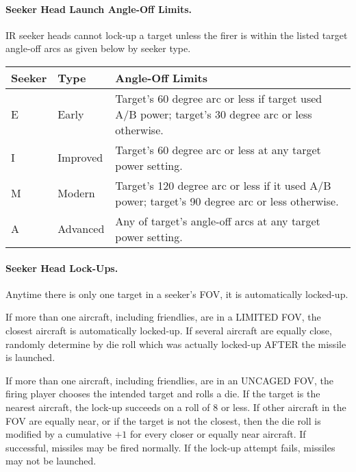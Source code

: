 \paragraph{Seeker Head Launch Angle-Off Limits.} IR seeker heads cannot lock-up a target unless the firer is within the listed target angle-off arcs as given below by seeker type.

\begin{table}[!ht]
\centering
\begin{tabular}{llp{5cm}}
\hline
\textbf{Seeker}  &\textbf{Type}       &\textbf{Angle-Off Limits}\\
\hline
E       &Early      &Target's 60 degree arc or less if target used A/B power; target's 30 degree arc or less otherwise.\\
I       &Improved   &Target's 60 degree arc or less at any target power setting.\\
M       &Modern	    &Target's 120 degree arc or less if it used A/B power; target's 90 degree arc or less otherwise.\\
A       &Advanced   &Any of target's angle-off arcs at any target power setting.\\
\hline
\end{tabular}
\end{table}


\paragraph{Seeker Head Lock-Ups.} Anytime there is only one target in a seeker's FOV, it is automatically locked-up.

If more than one aircraft, including friendlies, are in a LIMITED FOV, the closest aircraft is automatically locked-up. If several aircraft are equally close, randomly determine by die roll which was actually locked-up AFTER the missile is launched.

If more than one aircraft, including friendlies, are in an UNCAGED FOV, the firing player chooses the intended target and rolls a die. If the target is the nearest aircraft, the lock-up succeeds on a roll of 8 or less. If other aircraft in the FOV are equally near, or if the target is not the closest, then the die roll is modified by a cumulative $+1$ for every closer or equally near aircraft. If successful, missiles may be fired normally. If the lock-up attempt fails, missiles may not be launched.

